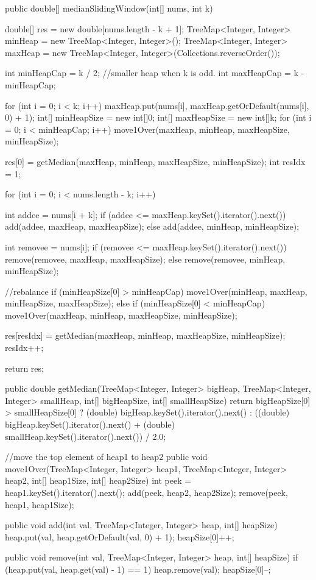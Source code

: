\begin{Code}
public double[] medianSlidingWindow(int[] nums, int k) {
    double[] res = new double[nums.length - k + 1];
    TreeMap<Integer, Integer> minHeap = new TreeMap<Integer, Integer>();
    TreeMap<Integer, Integer> maxHeap = new TreeMap<Integer, Integer>(Collections.reverseOrder());

    int minHeapCap = k / 2; //smaller heap when k is odd.
    int maxHeapCap = k - minHeapCap;

    for (int i = 0; i < k; i++) {
        maxHeap.put(nums[i], maxHeap.getOrDefault(nums[i], 0) + 1);
    }
    int[] minHeapSize = new int[]{0};
    int[] maxHeapSize = new int[]{k};
    for (int i = 0; i < minHeapCap; i++) {
        move1Over(maxHeap, minHeap, maxHeapSize, minHeapSize);
    }

    res[0] = getMedian(maxHeap, minHeap, maxHeapSize, minHeapSize);
    int resIdx = 1;

    for (int i = 0; i < nums.length - k; i++) {
        int addee = nums[i + k];
        if (addee <= maxHeap.keySet().iterator().next()) {
            add(addee, maxHeap, maxHeapSize);
        } else {
            add(addee, minHeap, minHeapSize);
        }

        int removee = nums[i];
        if (removee <= maxHeap.keySet().iterator().next()) {
            remove(removee, maxHeap, maxHeapSize);
        } else {
            remove(removee, minHeap, minHeapSize);
        }

        //rebalance
        if (minHeapSize[0] > minHeapCap) {
            move1Over(minHeap, maxHeap, minHeapSize, maxHeapSize);
        } else if (minHeapSize[0] < minHeapCap) {
            move1Over(maxHeap, minHeap, maxHeapSize, minHeapSize);
        }

        res[resIdx] = getMedian(maxHeap, minHeap, maxHeapSize, minHeapSize);
        resIdx++;
    }
    return res;
}

public double getMedian(TreeMap<Integer, Integer> bigHeap, TreeMap<Integer, Integer> smallHeap, int[] bigHeapSize, int[] smallHeapSize) {
    return bigHeapSize[0] > smallHeapSize[0] ? (double) bigHeap.keySet().iterator().next() : ((double) bigHeap.keySet().iterator().next() + (double) smallHeap.keySet().iterator().next()) / 2.0;
}

//move the top element of heap1 to heap2
public void move1Over(TreeMap<Integer, Integer> heap1, TreeMap<Integer, Integer> heap2, int[] heap1Size, int[] heap2Size) {
    int peek = heap1.keySet().iterator().next();
    add(peek, heap2, heap2Size);
    remove(peek, heap1, heap1Size);
}

public void add(int val, TreeMap<Integer, Integer> heap, int[] heapSize) {
    heap.put(val, heap.getOrDefault(val, 0) + 1);
    heapSize[0]++;
}

public void remove(int val, TreeMap<Integer, Integer> heap, int[] heapSize) {
    if (heap.put(val, heap.get(val) - 1) == 1) heap.remove(val);
    heapSize[0]--;
}
\end{Code}

